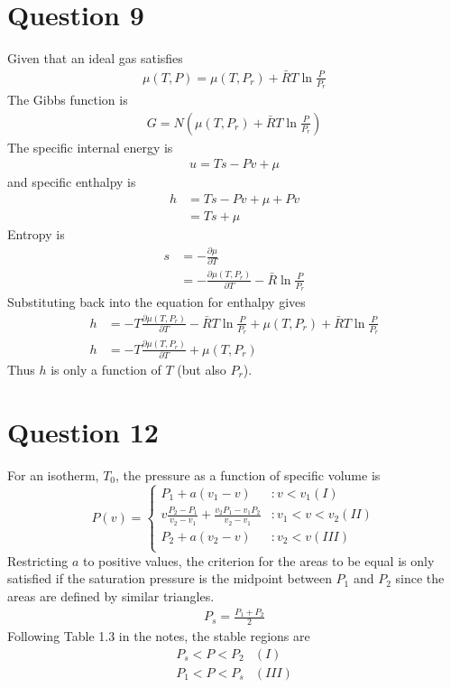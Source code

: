\documentclass{article}
\begin{document}
\section*{Question 9}
Given that an ideal gas satisfies
\begin{align*}
\mu (T,P)=\mu (T,P_r) +\bar{R}T\ln \frac{P}{P_r}
\end{align*}
The Gibbs function is
\begin{align*}
G=N(\mu (T,P_r) +\bar{R}T\ln \frac{P}{P_r})
\end{align*}
The specific internal energy is
\begin{align*}
u=Ts-Pv+\mu
\end{align*}
and specific enthalpy is
\begin{align*}
h&=Ts-Pv+\mu+Pv\\
&=Ts+\mu
\end{align*}
Entropy is
\begin{align*}
s&=-\frac{\partial \mu}{\partial T}\\
 &=-\frac{\partial \mu(T,P_r)}{\partial T}-\bar{R}\ln \frac{P}{P_r}
\end{align*}
Substituting back into the equation for enthalpy gives
\begin{align*}
h&=-T\frac{\partial \mu(T,P_r)}{\partial T}-\bar{R}T\ln \frac{P}{P_r}+\mu (T,P_r) +\bar{R}T\ln \frac{P}{P_r}\\
h&=-T\frac{\partial \mu(T,P_r)}{\partial T}+\mu (T,P_r)
\end{align*}
Thus $h$ is only a function of $T$ (but also $P_r$).

\section*{Question 12}

For an isotherm, $T_0$, the pressure as a function of specific volume is
\begin{displaymath}
   P(v) = \left\{
     \begin{array}{lr}
       P_1 + a(v_1 -v) & : v < v_1 (I)\\
       v\frac{P_2-P_1}{v_2-v_1}+ \frac{v_2P_1-v_1P_2}{v_2-v_1}& : v_1 < v < v_2 (II)\\
       P_2 + a(v_2 -v) & :  v_2 < v (III)\\
     \end{array}
   \right.
\end{displaymath}
Restricting $a$ to positive values, the criterion for the areas to be equal is only satisfied if the saturation pressure is the midpoint between $P_1$ and $P_2$ since the areas are defined by similar triangles.
\begin{align*}
P_s=\frac{P_1+P_2}{2}
\end{align*}
Following Table 1.3 in the notes, the stable regions are
\begin{displaymath}
     \begin{array}{lr}
       P_s < P < P_2 & (I)\\
       P_1 < P < P_s & (III)\\
     \end{array}
\end{displaymath}
\end{document}
